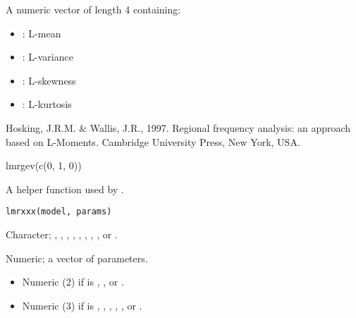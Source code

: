 \documentclass[a4paper]{book}
\begin{document}
%
\begin{Value}
A numeric vector of length 4 containing:
\begin{itemize}

\item{} : L-mean
\item{} : L-variance
\item{} : L-skewness
\item{} : L-kurtosis

\end{itemize}

\end{Value}
%
\begin{References}
Hosking, J.R.M. \& Wallis, J.R., 1997. Regional frequency analysis: an approach based
on L-Moments. Cambridge University Press, New York, USA.
\end{References}
%
\begin{Examples}
\begin{ExampleCode}
lmrgev(c(0, 1, 0))

\end{ExampleCode}
\end{Examples}
%
\begin{Description}
A helper function used by .
\end{Description}
%
\begin{Usage}
\begin{verbatim}
lmrxxx(model, params)
\end{verbatim}
\end{Usage}
%
\begin{Arguments}
\begin{ldescription}
\item[\code{model}] Character; , , , , , ,
, , or .

\item[\code{params}] Numeric; a vector of parameters.
\begin{itemize}

\item{} Numeric (2) if  is , , or .
\item{} Numeric (3) if  is , , , , , or .

\end{itemize}

\end{ldescription}
\end{Arguments}
\end{document}
